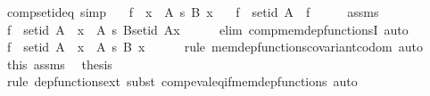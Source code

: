 \begin{isabellebody}
\endisatagproof
{\isafoldproof}%
%
\isadelimproof
\isanewline
%
\endisadelimproof
\isanewline
{}\isamarkupfalse%
\ comp{\isacharunderscore}{\kern0pt}set{\isacharunderscore}{\kern0pt}id{\isacharunderscore}{\kern0pt}eq\ {\isacharbrackleft}{\kern0pt}simp{\isacharbrackright}{\kern0pt}{\isacharcolon}{\kern0pt}\isanewline
\ \ \ {\isachardoublequoteopen}f\ {\isasymin}\ {\isacharparenleft}{\kern0pt}x\ {\isasymin}\ A{\isacharparenright}{\kern0pt}\ {\isasymrightarrow}s\ {\isacharparenleft}{\kern0pt}B\ x{\isacharparenright}{\kern0pt}{\isachardoublequoteclose}\isanewline
\ \ \ {\isachardoublequoteopen}f\ {\isasymcirc}\ set{\isacharunderscore}{\kern0pt}id\ A\ {\isacharequal}{\kern0pt}\ f{\isachardoublequoteclose}\isanewline
%
\isadelimproof
%
\endisadelimproof
%
\isatagproof
{}\isamarkupfalse%
\ {\isacharminus}{\kern0pt}\isanewline
\ \ \isamarkupfalse%
\ assms\ \isamarkupfalse%
\ {\isachardoublequoteopen}f\ {\isasymcirc}\ set{\isacharunderscore}{\kern0pt}id\ A\ {\isasymin}\ {\isacharparenleft}{\kern0pt}x\ {\isasymin}\ A{\isacharparenright}{\kern0pt}\ {\isasymrightarrow}s\ {\isacharparenleft}{\kern0pt}B{\isacharparenleft}{\kern0pt}{\isacharparenleft}{\kern0pt}set{\isacharunderscore}{\kern0pt}id\ A{\isacharparenright}{\kern0pt}{\isacharbackquote}{\kern0pt}x{\isacharparenright}{\kern0pt}{\isacharparenright}{\kern0pt}{\isachardoublequoteclose}\isanewline
\ \ \ \ \isamarkupfalse%
\ {\isacharparenleft}{\kern0pt}elim\ comp{\isacharunderscore}{\kern0pt}mem{\isacharunderscore}{\kern0pt}dep{\isacharunderscore}{\kern0pt}functionsI{\isacharparenright}{\kern0pt}\ auto\isanewline
\ \ \isamarkupfalse%
\ \isamarkupfalse%
\ {\isachardoublequoteopen}f\ {\isasymcirc}\ set{\isacharunderscore}{\kern0pt}id\ A\ {\isasymin}\ {\isacharparenleft}{\kern0pt}x\ {\isasymin}\ A{\isacharparenright}{\kern0pt}\ {\isasymrightarrow}s\ {\isacharparenleft}{\kern0pt}B\ x{\isacharparenright}{\kern0pt}{\isachardoublequoteclose}\isanewline
\ \ \ \ \isamarkupfalse%
\ {\isacharparenleft}{\kern0pt}rule\ mem{\isacharunderscore}{\kern0pt}dep{\isacharunderscore}{\kern0pt}functions{\isacharunderscore}{\kern0pt}covariant{\isacharunderscore}{\kern0pt}codom{\isacharparenright}{\kern0pt}\ auto\isanewline
\ \ \isamarkupfalse%
\ this\ assms\ \isamarkupfalse%
\ {\isacharquery}{\kern0pt}thesis\isanewline
\ \ \ \ \isamarkupfalse%
\ {\isacharparenleft}{\kern0pt}rule\ dep{\isacharunderscore}{\kern0pt}functions{\isacharunderscore}{\kern0pt}ext{\isacharcomma}{\kern0pt}\ subst\ comp{\isacharunderscore}{\kern0pt}eval{\isacharunderscore}{\kern0pt}eq{\isacharunderscore}{\kern0pt}if{\isacharunderscore}{\kern0pt}mem{\isacharunderscore}{\kern0pt}dep{\isacharunderscore}{\kern0pt}functions{\isacharparenright}{\kern0pt}\ auto\isanewline

\end{isabellebody}
